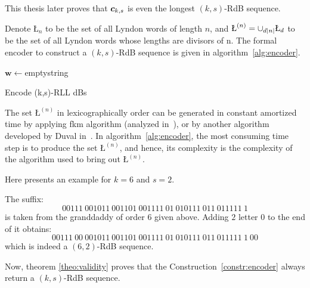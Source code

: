 This thesis later proves that ${\boldsymbol c}_{k,s}$ is even the longest $(k,s)$-RdB sequence. 

Denote \L$_{n}$ to be the set of all Lyndon words of length $n$, and $\text{\L}^{(n)}=\cup_{d\card n}\text{\L}_{d}$ to be the set of all Lyndon words whose lengths are divisors of n. The formal encoder to construct a $(k,s)$-RdB sequence is given in algorithm~\ref{alg:encoder}.

\begin{algorithm}
\DontPrintSemicolon
    \BlankLine
    
    $\mathbf{w}\gets$emptystring\;
    \caption{Encode (k,s)-RLL dBs}
    \label{alg:encoder}
\end{algorithm}

The set $\text{\L}^{(n)}$ in lexicographically order can be generated in constant amortized time by applying \gls{fkm} algorithm (analyzed in~\cite{ruskey1992generating}), or by another algorithm developed by Duval in~\cite{duval1988generation}. In algorithm~\ref{alg:encoder}, the most consuming time step is to produce the set $\text{\L}^{(n)}$, and hence, its complexity is the complexity of the algorithm used to bring out $\text{\L}^{(n)}$.

Here presents an example for $k=6$ and $s=2$. 
\begin{example}
    The suffix: $$00111\ 001011\ 001101\ 001111\ 01\ 010111\ 011\ 011111\ 1$$ is taken from the granddaddy of order $6$ given above. Adding $2$ letter $0$ to the end of it obtains:
    \[
        00111\ 00\ 001011\ 001101\ 001111\ 01\ 010111\ 011\ 011111\ 1\ 00
    \]
    which is indeed a $(6,2)$-RdB sequence.
\end{example}
Now, theorem \ref{theo:validity} proves that the Construction~\ref{constr:encoder} always return a $(k,s)$-RdB sequence.

